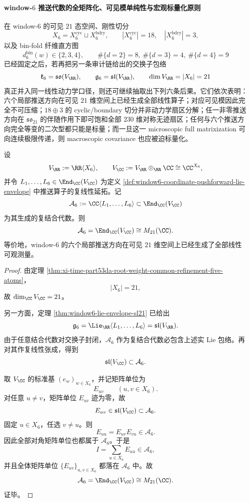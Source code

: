 \paragraph{window-\texorpdfstring{$6$}{6} 推送代数的全矩阵化、可见模单纯性与宏观标量化原则}
在 window-\(6\) 的可见 \(21\) 态空间、刚性切分
\[
X_6=X_6^{\mathrm{cyc}}\sqcup X_6^{\mathrm{bdry}},
\qquad
|X_6^{\mathrm{cyc}}|=18,
\quad
|X_6^{\mathrm{bdry}}|=3,
\]
以及 bin-fold 纤维直方图
\[
d_6^{\mathrm{bin}}(w)\in\{2,3,4\},
\qquad
\#\{d=2\}=8,\ \#\{d=3\}=4,\ \#\{d=4\}=9
\]
已经固定之后，若再把另一条审计链给出的交换子包络
\[
\mathfrak{k}_6=\mathfrak{so}(V_{\RR}),
\qquad
\mathfrak{g}_6=\mathfrak{sl}(V_{\RR}),
\qquad
\dim V_{\RR}=|X_6|=21
\]
真正并入同一线性动力学口径，则还可继续抽取出下列六条后果。它们依次表明：六个局部推送方向在可见 \(21\) 维空间上已经生成全部线性算子；对应可见模因此完全不可压缩；\(18\oplus 3\) 的 cyclic/boundary 切分并非动力学扇区分解；任一非零推送方向在 \(\mathfrak{so}_{21}\) 的伴随作用下即可饱和全部 \(230\) 维对称无迹扇区；任何与六个推送方向完全等变的二次型都只能是标量；而一旦这一 microscopic full matrixization 可向连续极限传递，则 macroscopic covariance 也应被迫标量化。

\begin{theorem}\label{thm:xi-time-part9zn-window6-pushforward-algebra-full-matrixization}
设
\[
V_{\RR}:=\RR\langle X_6\rangle,
\qquad
V_{\CC}:=V_{\RR}\otimes_{\RR}\CC\cong \CC^{X_6},
\]
并令 \(L_1,\dots,L_6\in \End_{\CC}(V_{\CC})\) 为定义 \ref{def:window6-coordinate-pushforward-lie-envelope} 中推送算子的复线性延拓。记
\[
\mathcal A_6:=\CC\langle L_1,\dots,L_6\rangle\subset \End_{\CC}(V_{\CC})
\]
为其生成的复结合代数。则
\[
\mathcal A_6=\End_{\CC}(V_{\CC})\cong M_{21}(\CC).
\]
等价地，window-\(6\) 的六个局部推送方向在可见 \(21\) 维空间上已经生成了全部线性可观测量。
\end{theorem}
\begin{proof}
由定理 \ref{thm:xi-time-part53da-root-weight-common-refinement-five-atoms}，
\[
|X_6|=21,
\]
故 \(\dim_{\CC}V_{\CC}=21\)。

另一方面，定理 \ref{thm:window6-lie-envelope-sl21} 已给出
\[
\mathfrak g_6=\Lie_{\RR}\langle L_1,\dots,L_6\rangle=\mathfrak{sl}(V_{\RR}).
\]
由于任意结合代数对交换子封闭，\(\mathcal A_6\) 作为复结合代数必包含上述实 Lie 包络。再对其作复线性张成，得到
\[
\mathfrak{sl}(V_{\CC})\subset \mathcal A_6.
\]

取 \(V_{\CC}\) 的标准基 \((e_w)_{w\in X_6}\)，并记矩阵单位为
\[
E_{uv}\qquad (u,v\in X_6).
\]
对任意 \(u\neq v\)，矩阵单位 \(E_{uv}\) 迹为零，故
\[
E_{uv}\in \mathfrak{sl}(V_{\CC})\subset \mathcal A_6.
\]
固定 \(u\in X_6\)，任选 \(v\neq u\)。则
\[
E_{uu}=E_{uv}E_{vu}\in \mathcal A_6.
\]
因此全部对角矩阵单位也都属于 \(\mathcal A_6\)。于是
\[
I=\sum_{u\in X_6}E_{uu}\in \mathcal A_6,
\]
并且全体矩阵单位 \(\{E_{uv}\}_{u,v\in X_6}\) 都落在 \(\mathcal A_6\) 中。故
\[
\mathcal A_6=\End_{\CC}(V_{\CC})\cong M_{21}(\CC).
\]
证毕。
\end{proof}

